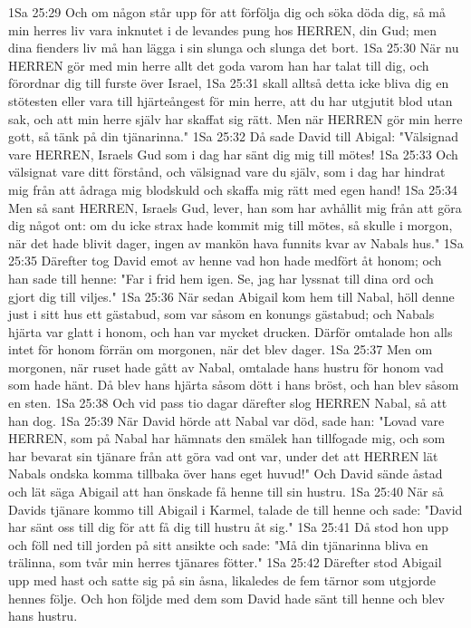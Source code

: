 1Sa 25:29  Och om någon står upp för att förfölja dig och söka döda dig, så må min herres liv vara inknutet i de levandes pung hos HERREN, din Gud; men dina fienders liv må han lägga i sin slunga och slunga det bort.
1Sa 25:30  När nu HERREN gör med min herre allt det goda varom han har talat till dig, och förordnar dig till furste över Israel,
1Sa 25:31  skall alltså detta icke bliva dig en stötesten eller vara till hjärteångest för min herre, att du har utgjutit blod utan sak, och att min herre själv har skaffat sig rätt. Men när HERREN gör min herre gott, så tänk på din tjänarinna."
1Sa 25:32  Då sade David till Abigal: "Välsignad vare HERREN, Israels Gud som i dag har sänt dig mig till mötes!
1Sa 25:33  Och välsignat vare ditt förstånd, och välsignad vare du själv, som i dag har hindrat mig från att ådraga mig blodskuld och skaffa mig rätt med egen hand!
1Sa 25:34  Men så sant HERREN, Israels Gud, lever, han som har avhållit mig från att göra dig något ont: om du icke strax hade kommit mig till mötes, så skulle i morgon, när det hade blivit dager, ingen av mankön hava funnits kvar av Nabals hus."
1Sa 25:35  Därefter tog David emot av henne vad hon hade medfört åt honom; och han sade till henne: "Far i frid hem igen. Se, jag har lyssnat till dina ord och gjort dig till viljes."
1Sa 25:36  När sedan Abigail kom hem till Nabal, höll denne just i sitt hus ett gästabud, som var såsom en konungs gästabud; och Nabals hjärta var glatt i honom, och han var mycket drucken. Därför omtalade hon alls intet för honom förrän om morgonen, när det blev dager.
1Sa 25:37  Men om morgonen, när ruset hade gått av Nabal, omtalade hans hustru för honom vad som hade hänt. Då blev hans hjärta såsom dött i hans bröst, och han blev såsom en sten.
1Sa 25:38  Och vid pass tio dagar därefter slog HERREN Nabal, så att han dog.
1Sa 25:39  När David hörde att Nabal var död, sade han: "Lovad vare HERREN, som på Nabal har hämnats den smälek han tillfogade mig, och som har bevarat sin tjänare från att göra vad ont var, under det att HERREN lät Nabals ondska komma tillbaka över hans eget huvud!" Och David sände åstad och lät säga Abigail att han önskade få henne till sin hustru.
1Sa 25:40  När så Davids tjänare kommo till Abigail i Karmel, talade de till henne och sade: "David har sänt oss till dig för att få dig till hustru åt sig."
1Sa 25:41  Då stod hon upp och föll ned till jorden på sitt ansikte och sade: "Må din tjänarinna bliva en trälinna, som tvår min herres tjänares fötter."
1Sa 25:42  Därefter stod Abigail upp med hast och satte sig på sin åsna, likaledes de fem tärnor som utgjorde hennes följe. Och hon följde med dem som David hade sänt till henne och blev hans hustru.
